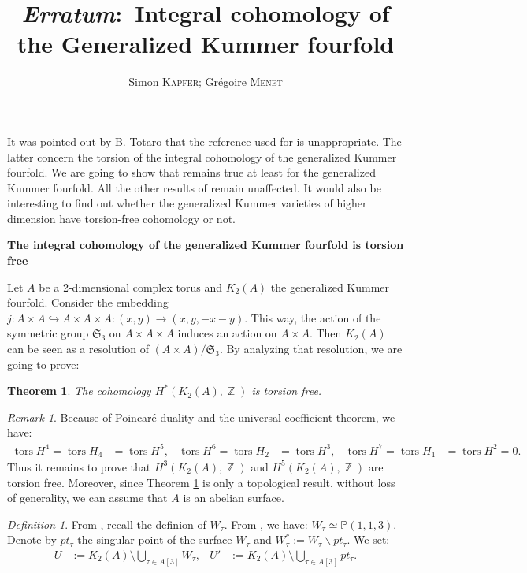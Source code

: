 \documentclass[a4paper]{article}
\newtheorem{thm}{Theorem}
\theoremstyle{remark}
\newtheorem{rmk}{Remark}
\newtheorem{defi}{Definition}
\DeclareMathOperator{\Z}{\mathbb{Z}}
\DeclareMathOperator{\tors}{tors}
\begin{document}
\title{\emph{Erratum}:\ \bf  Integral cohomology of the Generalized Kummer fourfold}

\author{Simon \textsc{Kapfer}; Gr\'egoire \textsc{Menet}} 

\maketitle
It was pointed out by B. Totaro that the reference used for \cite[Theorem 5.2]{Original} is unappropriate. The latter concern the torsion of the integral cohomology of the generalized Kummer fourfold. We are going to show that \cite[Theorem 5.2]{Original} remains true at least for the generalized Kummer fourfold. All the other results of \cite{Original} remain unaffected. It would also be interesting to find out whether the generalized Kummer varieties of higher dimension have torsion-free cohomology or not.
 \begin{center}
 \begin{large}
 \textbf{The integral cohomology of the generalized Kummer fourfold is torsion free}
 \end{large}
 \end{center}
Let $A$ be a 2-dimensional complex torus and $K_2(A)$ the generalized Kummer fourfold. Consider the embedding $j:A\times A\hookrightarrow A\times A \times A: (x,y)\rightarrow (x,y,-x-y)$.
This way, the action of the symmetric group $\mathfrak{S}_3$ on $A\times A \times A$ induces an action on $A\times A$.
Then $K_2(A)$ can be seen as a resolution of $\left(A\times A\right)/\mathfrak{S}_3$. 
By analyzing that resolution, we are going to prove:
\begin{thm}\label{main}
The cohomology $H^*(K_2(A),\Z)$ is torsion free.
\end{thm}
\begin{rmk}
Because of Poincar\'e duality and the universal coefficient theorem, we have:
\begin{align*}
\tors H^4=\tors H_4&=\tors H^5,& \tors H^6=\tors H_2&=\tors H^3,& \tors H^7=\tors H_1&=\tors H^2=0.
\end{align*}
Thus it remains to prove that $H^3(K_2(A),\Z)$ and $H^5(K_2(A),\Z)$ are torsion free. Moreover, since Theorem \ref{main} is only a topological result, without loss of generality, we can assume that $A$ is an abelian surface.
\end{rmk}
\begin{defi}
From \cite[Notation 6.19]{Original}, recall the definion of $W_\tau$. From \cite[Section 4]{Hassett}, we have:
$W_\tau\simeq \mathbb{P}(1,1,3)$. 
Denote by $pt_\tau$ the singular point of the surface $W_\tau$ and $W_\tau^*:=W_\tau\smallsetminus pt_\tau$.
We set:
\begin{align*}
U&:=K_2(A)\setminus \bigcup_{\tau\in A[3]} W_\tau, &
U'&:=K_2(A)\setminus \bigcup_{\tau\in A[3]} pt_\tau.
\end{align*}
\end{defi}
\end{document}
